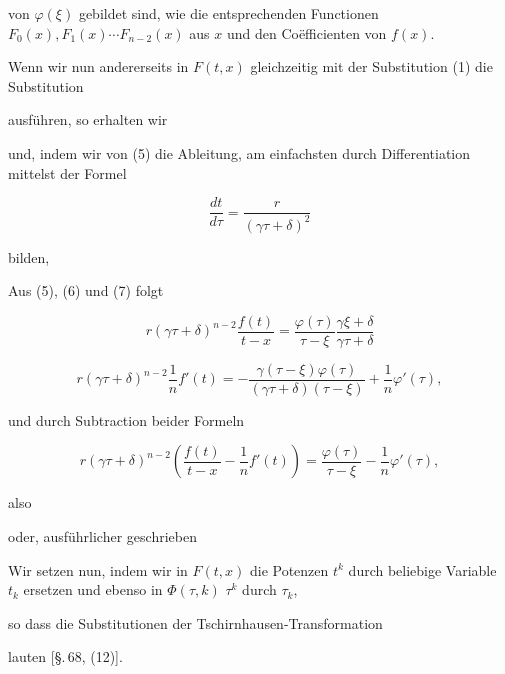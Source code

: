 von $\varphi(\xi)$ gebildet sind, wie die entsprechenden Functionen
$F_0(x), F_1(x) \cdots F_{n-2}(x)$ aus $x$ und den Co\"efficienten von $f(x)$.

Wenn wir nun andererseits in $F(t, x)$ gleichzeitig mit der
Substitution (1) die Substitution


ausf\"uhren, so erhalten wir


und, indem wir von (5) die Ableitung, am einfachsten durch
Differentiation mittelst der Formel

\[
\frac{dt}{d\tau} = \frac{r}{(\gamma\tau+\delta)^2}
\]

bilden,


Aus (5), (6) und (7) folgt

\[
r(\gamma\tau+\delta)^{n-2}\frac{f(t)}{t-x} = \frac{\varphi(\tau)}{\tau-\xi}\frac{\gamma\xi+\delta}{\gamma\tau+\delta}
\]

\[
r(\gamma\tau+\delta)^{n-2}\frac{1}{n}f'(t) = -\frac{\gamma(\tau-\xi)\varphi(\tau)}{(\gamma\tau+\delta)(\tau-\xi)} + \frac{1}{n}\varphi'(\tau),
\]

und durch Subtraction beider Formeln

\[
r(\gamma\tau+\delta)^{n-2}\left(\frac{f(t)}{t-x} - \frac{1}{n}f'(t)\right) = \frac{\varphi(\tau)}{\tau-\xi} - \frac{1}{n}\varphi'(\tau),
\]

also


oder, ausf\"uhrlicher geschrieben


Wir setzen nun, indem wir in $F(t, x)$ die Potenzen $t^k$ durch
beliebige Variable $t_k$ ersetzen und ebenso in $\Phi(\tau, k)$ %
$\tau^k$ durch $\tau_k$,


so dass die Substitutionen der Tschirnhausen-Transformation


lauten [\S.\,68, (12)].
